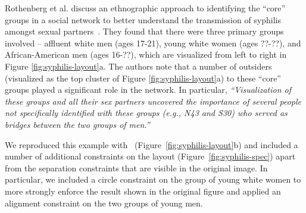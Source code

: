 Rothenberg et al. discuss an ethnographic approach to identifying the ``core'' groups in a social network to better understand the transmission of syphilis amongst sexual partners~\cite{rothenberg1998using}. They found that there were three primary groups involved -- affluent white men (ages 17-21), young white women (ages ??-??), and African-American men (ages 16-??), which are visualized from left to right in Figure \ref{fig:syphilis-layout}a. The authors note that a number of outsiders (visualized as the top cluster of Figure \ref{fig:syphilis-layout}a) to these ``core'' groups played a significant role in the network. In particular, \emph{``Visualization of these groups and all their sex partners uncovered the importance of several people not specifically identified with these groups (e.g., N43 and S30) who served as bridges between the two groups of men.''}


We reproduced this example with \projectname~(Figure~\ref{fig:syphilis-layout}b) and included a number of additional constraints on the layout (Figure~\ref{fig:syphilis-spec}) apart from the separation constraints that are visible in the original image. In particular, we included a circle constraint on the group of young white women to more strongly enforce the result shown in the original figure and applied an alignment constraint on the two groups of young men. 

\subsection{}
